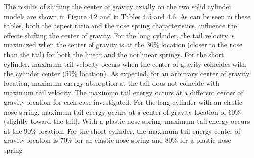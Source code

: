      The results of shifting the center of gravity axially on the two
solid cylinder models are shown in Figure 4.2 and in
Tables 4.5 and 4.6.  As can be seen
in these tables, both the aspect ratio and the nose spring
characteristics, influence 
the effects shifting the center of gravity.
For the long cylinder, the tail velocity is
maximized when the center of gravity is at the 30\% location (closer to
the nose than the tail) for both the linear and the nonlinear springs.
For the short cylinder, maximum tail velocity occurs when the 
center of gravity 
coincides with the cylinder center (50\% location). As
expected, for an arbitrary center of gravity location, maximum energy
absorption at the tail does not coincide with maximum tail
velocity.  The maximum tail energy occurs at a different 
center of gravity 
location for each case investigated.  For the long cylinder
with an elastic nose spring, maximum tail energy occurs at a 
center of gravity 
location of 60\% (slightly toward the tail).  With a plastic
nose spring, maximum tail energy occurs at the 90\% location. For the
short cylinder, the maximum tail energy center of gravity location is
70\% for an elastic nose spring and 80\% for a plastic nose spring.  

